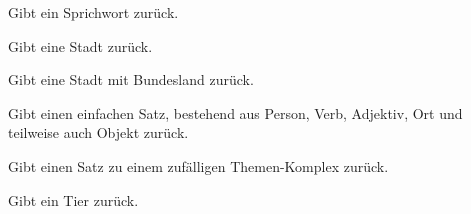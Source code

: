\documentclass[a4paper,12pt,oneside]{sphinxmanual}
\begin{document}
\begin{fulllineitems}
\label{funktionen:pyzufall.sprichwort}
Gibt ein Sprichwort zurück.

\end{fulllineitems}


\begin{fulllineitems}
\label{funktionen:pyzufall.stadt}
Gibt eine Stadt zurück.

\end{fulllineitems}


\begin{fulllineitems}
\label{funktionen:pyzufall.stadt_bl}
Gibt eine Stadt mit Bundesland zurück.

\end{fulllineitems}


\begin{fulllineitems}
\label{funktionen:pyzufall.standard_satz}
Gibt einen einfachen Satz, bestehend aus Person, Verb, Adjektiv, Ort und teilweise auch Objekt zurück.

\end{fulllineitems}


\begin{fulllineitems}
\label{funktionen:pyzufall.themen_satz}
Gibt einen Satz zu einem zufälligen Themen-Komplex zurück.

\end{fulllineitems}


\begin{fulllineitems}
\label{funktionen:pyzufall.tier}
Gibt ein Tier zurück.

\end{fulllineitems}

\end{document}
